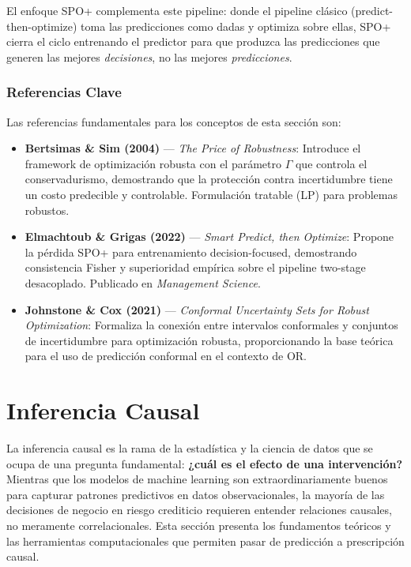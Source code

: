 \documentclass[
  spanish,
  11pt,
  letterpaper,
]{scrbook}
\providecommand{\tightlist}{%
  \setlength{\itemsep}{0pt}\setlength{\parskip}{0pt}}
\theoremstyle{plain}
\theoremstyle{remark}
\begin{document}
El enfoque SPO+ complementa este pipeline: donde el pipeline clásico
(predict-then-optimize) toma las predicciones como dadas y optimiza
sobre ellas, SPO+ cierra el ciclo entrenando el predictor para que
produzca las predicciones que generen las mejores \emph{decisiones}, no
las mejores \emph{predicciones}.

\subsection{Referencias Clave}\label{sec-optimization-references}

Las referencias fundamentales para los conceptos de esta sección son:

\begin{itemize}
\tightlist
\item
  \textbf{Bertsimas \& Sim (2004)} --- \emph{The Price of Robustness}:
  Introduce el framework de optimización robusta con el parámetro
  \(\Gamma\) que controla el conservadurismo, demostrando que la
  protección contra incertidumbre tiene un costo predecible y
  controlable. Formulación tratable (LP) para problemas robustos.
\item
  \textbf{Elmachtoub \& Grigas (2022)} --- \emph{Smart Predict, then
  Optimize}: Propone la pérdida SPO+ para entrenamiento
  decision-focused, demostrando consistencia Fisher y superioridad
  empírica sobre el pipeline two-stage desacoplado. Publicado en
  \emph{Management Science}.
\item
  \textbf{Johnstone \& Cox (2021)} --- \emph{Conformal Uncertainty Sets
  for Robust Optimization}: Formaliza la conexión entre intervalos
  conformales y conjuntos de incertidumbre para optimización robusta,
  proporcionando la base teórica para el uso de predicción conformal en
  el contexto de OR.
\end{itemize}

\chapter{Inferencia Causal}\label{sec-causal-inference-primer}

La inferencia causal es la rama de la estadística y la ciencia de datos
que se ocupa de una pregunta fundamental: \textbf{¿cuál es el efecto de
una intervención?} Mientras que los modelos de machine learning son
extraordinariamente buenos para capturar patrones predictivos en datos
observacionales, la mayoría de las decisiones de negocio en riesgo
crediticio requieren entender relaciones causales, no meramente
correlacionales. Esta sección presenta los fundamentos teóricos y las
herramientas computacionales que permiten pasar de predicción a
prescripción causal.
\end{document}
